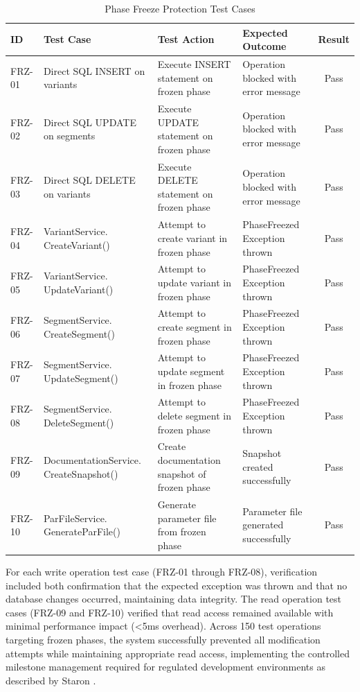 \begin{table}[H]
\centering
\caption{Phase Freeze Protection Test Cases}
\label{tab}
\begin{tabular}{|p{0.7cm}|p{4.1cm}|p{3.5cm}|p{3.5cm}|c|}
\hline
\textbf{ID} & \textbf{Test Case} & \textbf{Test Action} & \textbf{Expected Outcome} & \textbf{Result} \\
\hline
FRZ-01 & Direct SQL INSERT on variants & Execute INSERT statement on frozen phase & Operation blocked with error message & Pass \\  
\hline
FRZ-02 & Direct SQL UPDATE on segments & Execute UPDATE statement on frozen phase & Operation blocked with error message & Pass \\
\hline
FRZ-03 & Direct SQL DELETE on variants & Execute DELETE statement on frozen phase & Operation blocked with error message & Pass \\
\hline
FRZ-04 & VariantService. CreateVariant() & Attempt to create variant in frozen phase & PhaseFreezed Exception thrown & Pass \\
\hline
FRZ-05 & VariantService. UpdateVariant() & Attempt to update variant in frozen phase & PhaseFreezed Exception thrown & Pass \\
\hline
FRZ-06 & SegmentService. CreateSegment() & Attempt to create segment in frozen phase & PhaseFreezed Exception thrown & Pass \\
\hline
FRZ-07 & SegmentService. UpdateSegment() & Attempt to update segment in frozen phase & PhaseFreezed Exception thrown & Pass \\
\hline
FRZ-08 & SegmentService. DeleteSegment() & Attempt to delete segment in frozen phase & PhaseFreezed Exception thrown & Pass \\
\hline
FRZ-09 & DocumentationService. CreateSnapshot() & Create documentation snapshot of frozen phase & Snapshot created successfully & Pass \\
\hline
FRZ-10 & ParFileService. GenerateParFile() & Generate parameter file from frozen phase & Parameter file generated successfully & Pass \\
\hline
\end{tabular}
\end{table}

For each write operation test case (FRZ-01 through FRZ-08), verification included both confirmation that the expected exception was thrown and that no database changes occurred, maintaining data integrity. The read operation test cases (FRZ-09 and FRZ-10) verified that read access remained available with minimal performance impact (<5ms overhead). Across 150 test operations targeting frozen phases, the system successfully prevented all modification attempts while maintaining appropriate read access, implementing the controlled milestone management required for regulated development environments as described by Staron \cite{staron2021automotive}.

